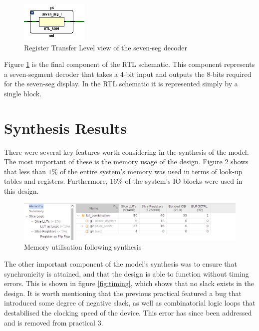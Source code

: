 \documentclass[12pt,a4paper]{article}
\begin{document}
\begin{figure}[H]
    \centering
    \includegraphics[scale=0.25]{images/rtl_ssd.png}
    \caption{Register Transfer Level view of the seven-seg decoder}
    \label{fig:rtl_ssd}
\end{figure}

Figure \ref{fig:rtl_ssd} is the final component of the RTL schematic. This component represents a seven-segment decoder that takes a 4-bit input and outputs the 8-bits required for the seven-seg display. In the RTL schematic it is represented simply by a single block.


\section{Synthesis Results}

There were several key features worth considering in the synthesis of the model. The most important of these is the memory usage of the design. Figure \ref{fig:memory} shows that less than $1\%$ of the entire system's memory was used in terms of look-up tables and registers. Furthermore, $16\%$ of the system's IO blocks were used in this design.

\begin{figure}[H]
    \centering
    \includegraphics[scale=0.25]{images/synthesis_utilisation.png}
    \caption{Memory utilisation following synthesis}
    \label{fig:memory}
\end{figure}

The other important component of the model's synthesis was to ensure that synchronicity is attained, and that the design is able to function without timing errors. This is shown in figure \ref{fig:timing}, which shows that no slack exists in the design. It is worth mentioning that the previous practical featured a bug that introduced some degree of negative slack, as well as combinatorial logic loops that destabilised the clocking speed of the device. This error has since been addressed and is removed from practical 3.
\end{document}
